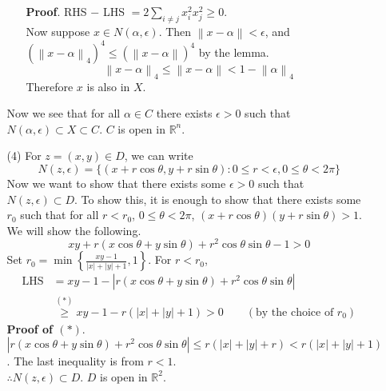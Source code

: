 \documentclass[12pt]{report}
\newcommand{\bb}[1]{\mathbb{#1}}
\newcommand{\norm}[1]{\left\lVert#1\right\rVert}
\newcommand{\abs}[1]{\left|#1\right|}
\newcommand{\ds}{\displaystyle}
\begin{document}
\begin{enumerate}
\begin{enumerate}
\begin{enumerate}
		\textbf{Proof}. RHS $-$ LHS $= 2 \sum_{i\neq j} x_i^2x_j^2 \geq 0$.\\
		Now suppose $x\in N(\alpha, \epsilon)$. Then $ \norm{x-\alpha} < \epsilon$, and $(\norm{x-\alpha}_4)^4 \leq \left(\norm{x-\alpha}\right)^4$ by the lemma.$$\norm{x-\alpha}_4 \leq \norm{x-\alpha} < 1-\norm{\alpha}_4$$
		Therefore $x$ is also in $X$.
	\end{enumerate}
	Now we see that for all $\alpha \in C$ there exists $\epsilon > 0$ such that  $N(\alpha, \epsilon) \subset X\subset C$. $C$ is open in $\bb{R}^n$.
	\item[(4)] For $z = (x, y)\in D$, we can write $$N(z, \epsilon) = \{(x +r\cos\theta, y + r\sin\theta) : 0\leq r<\epsilon, 0\leq \theta < 2\pi \}$$
	Now we want to show that there exists some $\epsilon>0$ such that $N(z, \epsilon) \subset D$. To show this, it is enough to show that there exists some $r_0$ such that for all $r < r_0$, $0\leq \theta<2\pi$, $(x+r\cos\theta)(y + r\sin\theta) > 1$. We will show the following.
	$$xy + r(x\cos\theta + y\sin\theta) + r^2\cos\theta\sin\theta -1 >0$$
	Set $\ds r_0 = \min\left\{ \frac{xy-1}{\abs{x}+\abs{y} + 1}, 1 \right\}$. For $r<r_0$,
	$$\begin{aligned}
		\text{LHS} &= xy - 1  - \abs{r(x\cos\theta + y\sin\theta) + r^2\cos\theta\sin\theta}\\ &\overset{(*)}{\geq} xy-1-r(\abs{x}+\abs{y} + 1) > 0\qquad  (\text{by the choice of } r_0)
	\end{aligned}$$
	\textbf{Proof of $(*)$}. $\abs{r(x\cos\theta + y\sin\theta) + r^2\cos\theta\sin\theta} \leq r(\abs{x}+\abs{y} +r) < r(\abs{x}+\abs{y}+1)$. The last inequality is from $r < 1$.\\
	$\therefore N(z, \epsilon) \subset D$. $D$ is open in $\bb{R}^2$.
\end{enumerate}


\end{enumerate}
\end{document}
